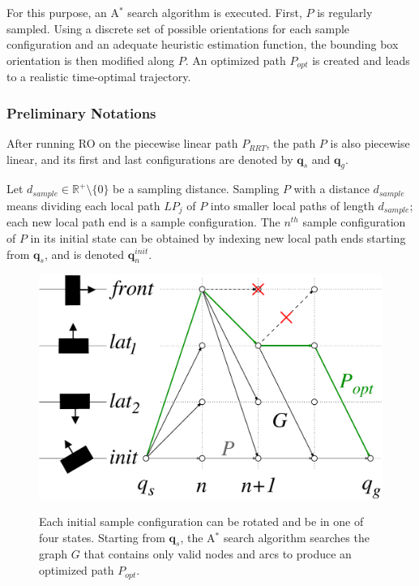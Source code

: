 For this purpose, an A$^{*}$ search algorithm is executed. First, $P$
is regularly sampled. Using a discrete set of possible orientations
for each sample configuration and an adequate heuristic estimation
function, the bounding box orientation is then modified along $P$. An
optimized path $P_{opt}$ is created and leads to a realistic
time-optimal trajectory.

\subsubsection{Preliminary Notations}
After running RO on the piecewise linear path $P_{RRT}$, the
path $P$ is also piecewise linear, and its first and last
configurations are denoted by $\mathbf{q}_s$ and $\mathbf{q}_g$.

Let $d_{sample} \in \mathbb{R}^+\setminus\{0\}$ be a sampling
distance. Sampling $P$ with a distance $d_{sample}$ means dividing
each local path $LP_j$ of $P$ into smaller local paths of length
$d_{sample}$; each new local path end is a sample configuration. The
$n^{th}$ sample configuration of $P$ in its initial state can be
obtained by indexing new local path ends starting from $\mathbf{q}_s$,
and is denoted $\mathbf{q}_n^{init}$.

\begin{figure}
  \centering
      {\includegraphics[width = 0.75\linewidth]
        {src/chap1-path-optimization/A-star.pdf}}
      \caption{Each initial sample configuration can be rotated and be
        in one of four states. Starting from $\mathbf{q}_s$, the
        A$^{*}$ search algorithm searches the graph $G$ that contains
        only valid nodes and arcs to produce an optimized path
        $P_{opt}$.}
      \label{fig:chap1-A-star}
\end{figure}

